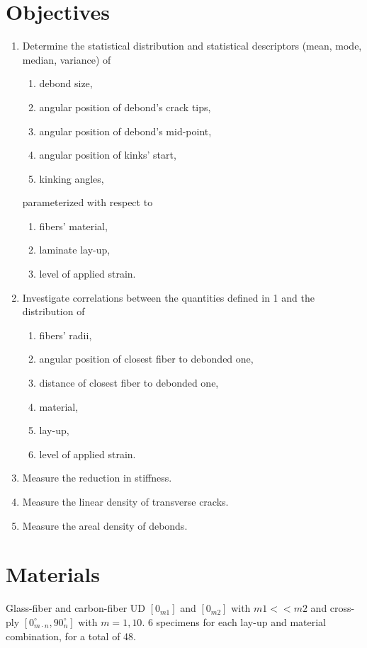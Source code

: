 \documentclass[review]{elsarticle}
\begin{document}
\section{Objectives}
\begin{enumerate}
\item Determine the statistical distribution and statistical descriptors (mean, mode, median, variance) of
\begin{enumerate}[label=\alph*]
\item debond size,
\item angular position of debond's crack tips,
\item angular position of debond's mid-point,
\item angular position of kinks' start,
\item kinking angles,
\end{enumerate}
parameterized with respect to
\begin{enumerate}[label=\alph*]
\item fibers' material,
\item laminate lay-up,
\item level of applied strain.
\end{enumerate}

\item Investigate correlations between the quantities defined in 1 and the distribution of
\begin{enumerate}[label=\alph*]
\item fibers' radii,
\item angular position of closest fiber to debonded one,
\item distance of closest fiber to debonded one,
\item material,
\item lay-up,
\item level of applied strain.
\end{enumerate}

\item Measure the reduction in stiffness.
\item Measure the linear density of transverse cracks.
\item Measure the areal density of debonds.

\end{enumerate}

\section{Materials}
Glass-fiber and carbon-fiber UD $[0_{m1}]$ and $[0_{m2}]$ with $m1<<m2$ and cross-ply $[0_{m\cdot n}^{\circ},90_{n}^{\circ}]$ with $m=1,10$. 6 specimens for each lay-up and material combination, for a total of 48.
\end{document}
